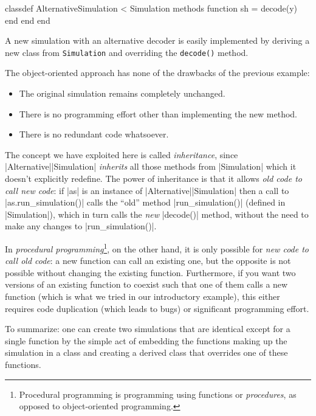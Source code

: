 \begin{listing}
\begin{Code}
  classdef AlternativeSimulation < Simulation
    methods
      function sh = decode(y)
      end
    end 
  end
\end{Code}
  \caption{A new simulation with an alternative decoder is easily implemented by
  deriving a new class from \texttt{Simulation} and overriding the
  \texttt{decode()} method.}
  \label{lst:derivedclass}
\end{listing}

The object-oriented approach has none of the drawbacks of the previous example:
\begin{itemize}
  \item The original simulation remains completely unchanged.
  \item There is no programming effort other than implementing the new method.
  \item There is no redundant code whatsoever.
\end{itemize}

The concept we have exploited here is called \emph{inheritance}, since
|Alternative|\-|Simulation| \emph{inherits} all those methods from
|Simulation| which it doesn't explicitly redefine.  The power of
inheritance is that it allows \emph{old code to call new code}: if |as| is an
instance of |Alternative|\-|Simulation| then a call to |as.run_simulation()|
calls the ``old'' method |run_simulation()| (defined in |Simulation|), which in
turn calls the \emph{new} |decode()| method, without the need to make any
changes to |run_simulation()|. 


In \emph{procedural programming}\footnote{Procedural programming is programming
using functions or \emph{procedures}, as opposed to object-oriented
programming.}, on the other hand, it is only possible for \emph{new code to call old code}: a new
function can call an existing one, but the opposite is not possible without
changing the existing function.  Furthermore, if you want two versions of an
existing function to coexist such that one of them calls a new function (which
is what we tried in our introductory example), this either requires code
duplication (which leads to bugs) or significant programming effort. 

To summarize: one can create two simulations that are identical except for a
single function by the simple act of embedding the functions making up the
simulation in a class and creating a derived class that overrides one of these
functions.


